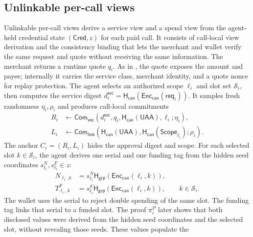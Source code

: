 \documentclass[letterpaper]{article}
\newcommand{\hash}{\mathsf{H}_{\mathsf{can}}}
\newcommand{\hashG}{\mathsf{H}_{\mathsf{grp}}}
\begin{document}
\subsection{Unlinkable per-call views}
\label{sec:pdbac}

Unlinkable per-call views derive a service view and a
spend view from the agent-held credential state
\((\mathsf{Cred},z)\) for each paid call.
It consists of call-local view derivation and the consistency binding that
lets the merchant and wallet verify the same request and quote without
receiving the same information.
The merchant returns a runtime quote \(q_i\). As in ,
the quote exposes the amount and payee; internally it carries the service
class, merchant identity, and a quote nonce for replay protection. The agent
selects an authorized scope \(\ell_i\) and slot set \(\mathcal S_i\), then
computes the service digest \(d_i^{\mathsf{svc}} =
\hash(\mathsf{Enc}_{\mathsf{can}}(\mathsf{req}_i))\).
It samples fresh randomness \(\eta_i,\rho_i\) and produces call-local
commitments
\begin{equation}
\begin{aligned}
R_i &\leftarrow
\mathsf{Com}_{\mathsf{vec}}
(d_i^{\mathsf{svc}}, q_i, \hash(\mathsf{UAA}), \ell_i; \eta_i),\\[2pt]
L_i &\leftarrow
\mathsf{Com}_{\mathsf{link}}
(\hash(\mathsf{UAA}), \hash(\mathsf{Scope}_{\ell_i}); \rho_i).
\end{aligned}
\label{eq:anchor-commitments}
\end{equation}
The anchor \(C_i=(R_i,L_i)\) hides the approval digest and scope.
For each selected slot \(k\in\mathcal S_i\), the agent derives one serial and
one funding tag from the hidden seed coordinates
\(s^N_{\ell_i},s^F_{\ell_i}\in z\):
\begin{equation}
\begin{aligned}
N_{\ell_i,k} &= s^N_{\ell_i}\hashG
  (\mathsf{Enc}_{\mathsf{can}}(\ell_i,k)),\\
T^F_{\ell_i,k} &= s^F_{\ell_i}\hashG
  (\mathsf{Enc}_{\mathsf{can}}(\ell_i,k)),
  \qquad k\in\mathcal S_i.
\end{aligned}
\label{eq:derive-spend-interface}
\end{equation}
The wallet uses the serial to reject double spending of the same slot. The
funding tag links that serial to a funded slot. The proof \(\pi_i^P\) later
shows that both disclosed values were derived from the hidden seed coordinates
and the selected slot, without revealing those seeds. These values populate the
\end{document}
